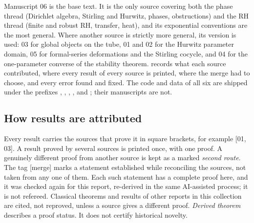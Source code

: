 \documentclass[11pt,a4paper]{article}
\numberwithin{equation}{section}
\theoremstyle{definition}
\theoremstyle{remark}
\newcommand{\src}[1]{\textup{[#1]}}
\newcommand{\merge}{\textup{[merge]}}
\begin{document}
Manuscript 06 is the base text. It is the only source covering both the
phase thread (Dirichlet algebra, Stirling and Hurwitz, phases, obstructions)
and the RH thread (finite and robust RH, transfer, heat), and its
exponential conventions are the most general. Where another source is
strictly more general, its version is used: 03 for global objects on the
tube, 01 and 02 for the Hurwitz parameter domain, 05 for formal-series
deformations and the Stirling cocycle, and 04 for the one-parameter
converse of the stability theorem.
 records what each source contributed, where every
result of every source is printed, where the merge had to choose, and every
error found and fixed. The code and data of all six are shipped under the
prefixes , ,
, , 
and ; their manuscripts are not.

\subsection{How results are attributed}\label{gz:sec:howtoread}
Every result carries the sources that prove it in square brackets, for
example \src{01, 03}. A result proved by several sources is printed once,
with one proof. A genuinely different proof from another source is kept
as a marked \emph{second route}. The tag \merge{} marks a statement
established while reconciling the sources, not taken from any one of them.
Each such statement has a complete proof here, and it was checked again
for this report, re-derived in the same AI-assisted process; it is not
refereed. Classical theorems and results of other reports in this
collection are cited, not reproved, unless a source gives a different
proof. \emph{Derived theorem} describes a proof status. It does not
certify historical novelty.
\end{document}
